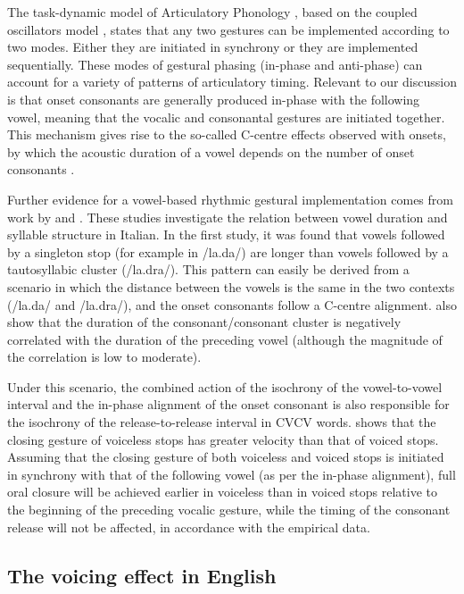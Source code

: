 \documentclass[
  12pt,
  a4paper,
]{article}
\begin{document}
The task-dynamic model \citep{saltzman2008} of Articulatory Phonology
\citep{ohala1986a, browman1988, browman1992}, based on the coupled
oscillators model \citep{odell2008}, states that any two gestures can be
implemented according to two modes. Either they are initiated in
synchrony or they are implemented sequentially. These modes of gestural
phasing (in-phase and anti-phase) can account for a variety of patterns
of articulatory timing. Relevant to our discussion is that onset
consonants are generally produced in-phase with the following vowel,
meaning that the vocalic and consonantal gestures are initiated
together. This mechanism gives rise to the so-called C-centre effects
observed with onsets, by which the acoustic duration of a vowel depends
on the number of onset consonants
\citep{browman1988, marin2010, hermes2013, marin2014}.

Further evidence for a vowel-based rhythmic gestural implementation
comes from work by \citet{farnetani1986} and \citet{celata2014}. These
studies investigate the relation between vowel duration and syllable
structure in Italian. In the first study, it was found that vowels
followed by a singleton stop (for example in /la.da/) are longer than
vowels followed by a tautosyllabic cluster (/la.dra/). This pattern can
easily be derived from a scenario in which the distance between the
vowels is the same in the two contexts (/la.da/ and /la.dra/), and the
onset consonants follow a C-centre alignment. \citet{celata2014} also
show that the duration of the consonant/consonant cluster is negatively
correlated with the duration of the preceding vowel (although the
magnitude of the correlation is low to moderate).

Under this scenario, the combined action of the isochrony of the
vowel-to-vowel interval and the in-phase alignment of the onset
consonant is also responsible for the isochrony of the
release-to-release interval in CVCV words. \citet{van-summers1987} shows
that the closing gesture of voiceless stops has greater velocity than
that of voiced stops. Assuming that the closing gesture of both
voiceless and voiced stops is initiated in synchrony with that of the
following vowel (as per the in-phase alignment), full oral closure will
be achieved earlier in voiceless than in voiced stops relative to the
beginning of the preceding vocalic gesture, while the timing of the
consonant release will not be affected, in accordance with the empirical
data.

\hypertarget{the-voicing-effect-in-english}{%
\subsection{The voicing effect in
English}\label{the-voicing-effect-in-english}}
\end{document}
